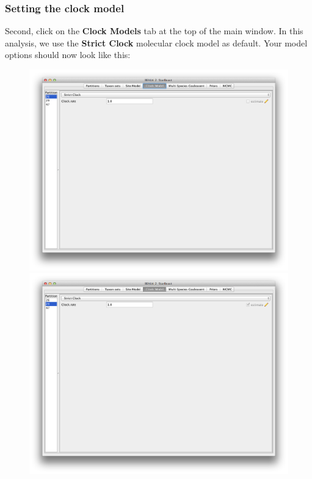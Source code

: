 \documentclass{article}
\begin{document}
\subsubsection*{Setting the clock model}

Second, click on the {\bf Clock Models} tab at the top of the
main window. In this analysis, we use the \textbf{Strict Clock} molecular clock model as default.
Your model options should now look like this: 

\begin{figure}
\begin{center}

\includegraphics[scale=0.4,clip=true,trim=0 450 0 0]{figures/BEAUti_ClockModel1.png}

\includegraphics[scale=0.4,clip=true,trim=0 450 0 0]{figures/BEAUti_ClockModel2.png}


\end{center}
\end{figure}
\end{document}
